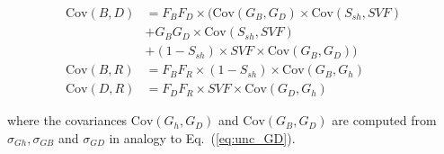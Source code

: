 \begin{equation}
\begin{aligned}
\mathrm{Cov}(B, D) & = F_{B}  F_{D} \times (\mathrm{Cov}(G_B, G_D) \times \mathrm{Cov}(S_{sh}, \mathit{SVF}) \\
& + G_B  G_D \times \mathrm{Cov}(S_{sh}, \mathit{SVF}) \\
& + (1-S_{sh}) \times \mathit{SVF} \times \mathrm{Cov}(G_B, G_D)) \\
\mathrm{Cov}(B, R) & = F_{B}  F_{R} \times (1-S_{sh}) \times \mathrm{Cov}(G_B, G_h) \\
\mathrm{Cov}(D, R) & = F_{D}  F_{R} \times \mathit{SVF}  \times      \mathrm{Cov}(G_D, G_h) 
\end{aligned}
\end{equation}

where the covariances $\mathrm{Cov}(G_h, G_D)$ and $\mathrm{Cov}(G_B, G_D)$ are computed from $\sigma_{Gh}, \sigma_{GB}$ and $\sigma_{GD}$ in analogy to Eq.~(\ref{eq:unc_GD}).